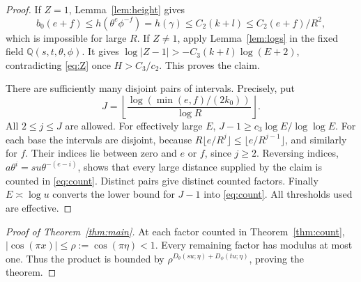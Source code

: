 \documentclass[11pt]{article}
\newcommand{\Q}{\mathbb Q}
\begin{document}
\begin{proof}
If $Z=1$, Lemma~\ref{lem:height} gives
\[
 b_0(e+f)\leq h(\theta^e\phi^{-f})=h(\gamma)
 \leq C_2(k+l)\leq C_2(e+f)/R^2,
\]
which is impossible for large $R$. If $Z\ne1$, apply
Lemma~\ref{lem:logs} in the fixed field $\Q(s,t,\theta,\phi)$.
It gives $\log|Z-1|>-C_3(k+l)\log(E+2)$, contradicting
\eqref{eq:Z} once $H>C_3/c_2$. This proves the claim.

There are sufficiently many disjoint pairs of intervals. Precisely, put
\[
 J=\left\lfloor\frac{\log(\min(e,f)/(2k_0))}{\log R}\right\rfloor.
\]
All $2\leq j\leq J$ are allowed. For effectively large $E$,
$J-1\geq c_3\log E/\log\log E$. For each base the intervals are
disjoint, because
$R\lfloor e/R^j\rfloor\leq\lfloor e/R^{j-1}\rfloor$,
and similarly for $f$. Their indices lie between zero and $e$ or $f$,
since $j\geq2$. Reversing indices, $a\theta^i=su\theta^{-(e-i)}$,
shows that every large distance supplied by the claim is counted in
\eqref{eq:count}. Distinct pairs give distinct counted factors.
Finally $E\asymp\log u$ converts the lower bound for $J-1$ into
\eqref{eq:count}. All thresholds used are effective.
\end{proof}

\begin{proof}[Proof of Theorem~\ref{thm:main}]
At each factor counted in Theorem~\ref{thm:count},
$|\cos(\pi x)|\leq\rho:=\cos(\pi\eta)<1$.
Every remaining factor has modulus at most one. Thus the product is
bounded by $\rho^{D_\theta(su;\eta)+D_\phi(tu;\eta)}$, proving the theorem.
\end{proof}
\end{document}
